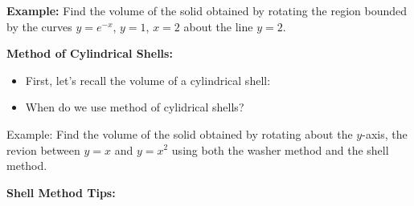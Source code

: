 \documentclass[12pt]{report}
\begin{document}
\noindent\textbf{Example:} Find the volume of the solid obtained by rotating the region bounded by the curves $y = e^{-x}$, $y = 1$, $x=2$ about the line $y = 2$.











\newpage

\noindent\textbf{Method of Cylindrical Shells:}

\bigskip

\begin{itemize}

\item First, let's recall the volume of a cylindrical shell: %

\bigskip

\bigskip

\bigskip

\item When do we use method of cylidrical shells? 



\bigskip\bigskip\bigskip

\end{itemize}

\noindent Example: Find the volume of the solid obtained by rotating about the $y$-axis, the revion between $y=x$ and $y=x^2$ using both the washer method and the shell method.

\vfill

\noindent\textbf{Shell Method Tips:}
\end{document}
